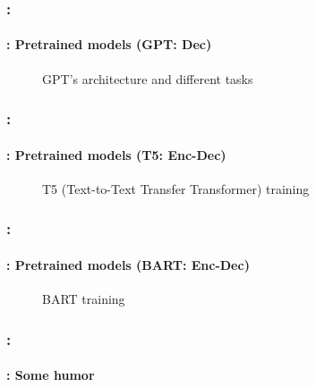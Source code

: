 \documentclass[xcolor=table]{beamer}
\begin{document}
\begin{frame}
	\frametitle{\insertshortsubtitle: \insertsection}
	\framesubtitle{\insertsubsection: Pretrained models (GPT: Dec) \cite{radford2018improving}}
	
	\begin{figure}[htbp]
		\caption{GPT's architecture and different tasks \cite{radford2018improving}}
	\end{figure}
	
\end{frame}


\begin{frame}
	\frametitle{\insertshortsubtitle: \insertsection}
	\framesubtitle{\insertsubsection: Pretrained models (T5: Enc-Dec) \cite{T5}}
	
	\begin{figure}[htbp]
		\caption{T5 (Text-to-Text Transfer Transformer) training \cite{T5}}
	\end{figure}
	
\end{frame}

\begin{frame}
	\frametitle{\insertshortsubtitle: \insertsection}
	\framesubtitle{\insertsubsection: Pretrained models (BART: Enc-Dec) \cite{bart}}
	
	\begin{figure}[htbp]
		\centering
		\caption{BART training \cite{bart}}
	\end{figure}
	
\end{frame}


\begin{frame}
	\frametitle{\insertshortsubtitle: \insertsection}
	\framesubtitle{\insertsubsection: Some humor}
	
	\begin{center}
	\end{center}
	
\end{frame}



\begin{frame}[plain]
	\begin{center}
	\end{center}
\end{frame}
\end{document}
